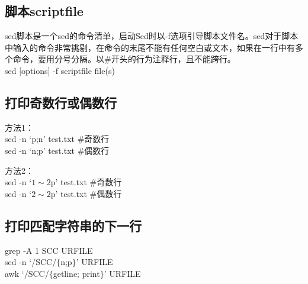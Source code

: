 \documentclass[12pt,a4paper]{article}
\begin{document}
\subsection{脚本scriptfile}
sed脚本是一个sed的命令清单，启动Sed时以-f选项引导脚本文件名。sed对于脚本中输入的命令非常挑剔，在命令的末尾不能有任何空白或文本，如果在一行中有多个命令，要用分号分隔。以$\#$开头的行为注释行，且不能跨行。 \\
sed $[$options$]$ -f scriptfile file(s) 

\subsection{打印奇数行或偶数行} 
方法1：\\
sed -n `p;n' test.txt $\#$奇数行 \\
sed -n `n;p' test.txt $\#$偶数行 

方法2：\\
sed -n `$1\sim 2$p' test.txt $\#$奇数行 \\
sed -n `$2\sim 2$p' test.txt $\#$偶数行 


\subsection{打印匹配字符串的下一行}
grep -A 1 SCC URFILE \\
sed -n `/SCC/$\{$n;p$\}$' URFILE \\
awk `/SCC/$\{$getline; print$\}$' URFILE
\end{document}
